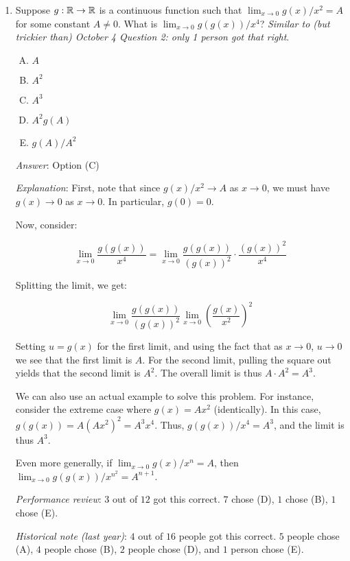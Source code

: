 \documentclass[10pt]{amsart}
\begin{document}
\begin{enumerate}
\item Suppose $g:\mathbb{R} \to \mathbb{R}$ is a continuous function such that
  $\lim_{x \to 0} g(x)/x^2 = A$ for some constant $A \ne 0$. What is
  $\lim_{x \to 0} g(g(x))/x^4$? {\em Similar to (but trickier than)
  October 4 Question 2: only 1 person got that right}.

  \begin{enumerate}[(A)]
  \item $A$
  \item $A^2$
  \item $A^3$
  \item $A^2g(A)$
  \item $g(A)/A^2$
  \end{enumerate}

  {\em Answer}: Option (C)

  {\em Explanation}: First, note that since $g(x)/x^2 \to A$ as $x \to
  0$, we must have $g(x) \to 0$ as $x \to 0$. In particular, $g(0) =
  0$.

  Now, consider:

  $$\lim_{x \to 0} \frac{g(g(x))}{x^4} = \lim_{x \to 0} \frac{g(g(x))}{(g(x))^2} \cdot \frac{(g(x))^2}{x^4}$$

  Splitting the limit, we get:

  $$\lim_{x \to 0} \frac{g(g(x))}{(g(x))^2} \lim_{x \to 0} \left(\frac{g(x)}{x^2}\right)^2$$

  Setting $u = g(x)$ for the first limit, and using the fact that as
  $x \to 0$, $u \to 0$ we see that the first limit is $A$. For the
  second limit, pulling the square out yields that the second limit is
  $A^2$. The overall limit is thus $A \cdot A^2 = A^3$.

  We can also use an actual example to solve this problem. For
  instance, consider the extreme case where $g(x) = Ax^2$ (identically). In
  this case, $g(g(x)) = A(Ax^2)^2 = A^3x^4$. Thus, $g(g(x))/x^4 =
  A^3$, and the limit is thus $A^3$.

  Even more generally, if $\lim_{x \to 0} g(x)/x^n = A$, then $\lim_{x
  \to 0} g(g(x))/x^{n^2} = A^{n + 1}$.

  {\em Performance review}: $3$ out of $12$ got this correct. $7$
  chose (D), $1$ chose (B), $1$ chose (E).

  {\em Historical note (last year)}: $4$ out of $16$ people got this
  correct. $5$ people chose (A), $4$ people chose (B), $2$ people
  chose (D), and $1$ person chose (E).


\end{enumerate}
\end{document}
